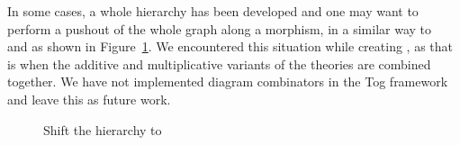 In some cases, a whole hierarchy has been developed and one may want to perform a pushout of the whole graph along a morphism, in a similar way to~\cite{cicm2019diagrams} and as shown in Figure~\ref{fig:shiftPMtoRingoid}. We encountered this situation while creating , as that is when the additive and multiplicative variants of the theories are combined together. We have not implemented diagram combinators in the Tog framework and leave this as future work. 
\begin{figure}[h]
\caption{Shift the  hierarchy to }
\label{fig:shiftPMtoRingoid}
\end{figure}

